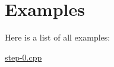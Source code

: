 \section{Examples}
Here is a list of all examples\-:\begin{DoxyCompactItemize}
\item 
\hyperlink{step-0_8cpp-example}{step-\/0.\-cpp}
\end{DoxyCompactItemize}
